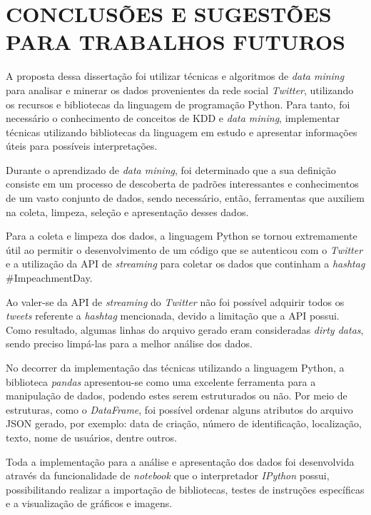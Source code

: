 \chapter{CONCLUSÕES E SUGESTÕES PARA TRABALHOS FUTUROS}\label{ch:conclusao}

A proposta dessa dissertação foi utilizar técnicas e algoritmos de \textit{data mining} para analisar e minerar os dados provenientes da rede social \textit{Twitter}, utilizando os recursos e bibliotecas da linguagem de programação Python. Para tanto, foi necessário o conhecimento de conceitos de KDD e \textit{data mining}, implementar técnicas utilizando bibliotecas da linguagem em estudo e apresentar informações úteis para possíveis interpretações.

Durante o aprendizado de \textit{data mining}, foi determinado que a sua definição consiste em um processo de descoberta de padrões interessantes e conhecimentos de um vasto conjunto de dados, sendo necessário, então, ferramentas que auxiliem na coleta, limpeza, seleção e apresentação desses dados.

Para a coleta e limpeza dos dados, a linguagem Python se tornou extremamente útil ao permitir o desenvolvimento de um código que se autenticou com o \textit{Twitter} e a utilização da API de \textit{streaming} para coletar os dados que continham a \textit{hashtag} \#ImpeachmentDay.

Ao valer-se da API de \textit{streaming} do \textit{Twitter} não foi possível adquirir todos os \textit{tweets} referente a \textit{hashtag} mencionada, devido a limitação que a API possui. Como resultado, algumas linhas do arquivo gerado eram consideradas \textit{dirty datas}, sendo preciso limpá-las para a melhor análise dos dados.

No decorrer da implementação das técnicas utilizando a linguagem Python, a biblioteca \textit{pandas} apresentou-se como uma excelente ferramenta para a manipulação de dados, podendo estes serem estruturados ou não. Por meio de estruturas, como o \textit{DataFrame}, foi possível ordenar alguns atributos do arquivo JSON gerado, por exemplo: data de criação, número de identificação, localização, texto, nome de usuários, dentre outros.

Toda a implementação para a análise e apresentação dos dados foi desenvolvida através da funcionalidade de \textit{notebook} que o interpretador \textit{IPython} possui, possibilitando realizar a importação de bibliotecas, testes de instruções específicas e a visualização de gráficos e imagens.

